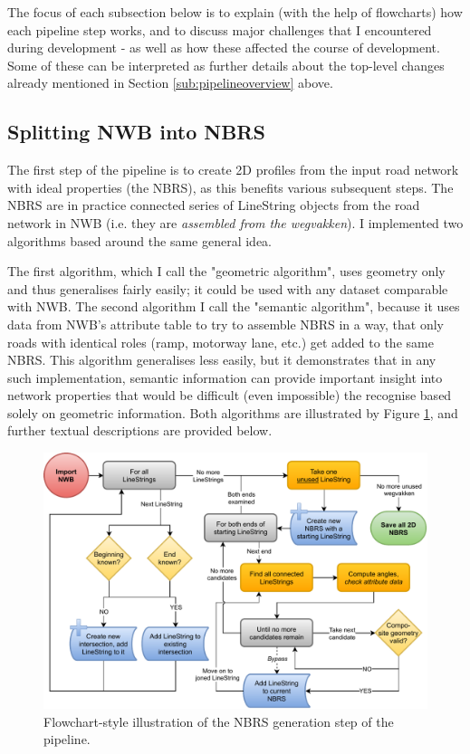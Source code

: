 The focus of each subsection below is to explain (with the help of flowcharts) how each pipeline step works, and to discuss major challenges that I encountered during development - as well as how these affected the course of development. Some of these can be interpreted as further details about the top-level changes already mentioned in Section \ref{sub:pipelineoverview} above.

\subsection{Splitting NWB into NBRS}
\label{sub:m_nbrsgeneration}

The first step of the pipeline is to create 2D profiles from the input road network with ideal properties (the NBRS), as this benefits various subsequent steps. The NBRS are in practice connected series of LineString objects from the road network in NWB (i.e. they are \textit{assembled from the wegvakken}). I implemented two algorithms based around the same general idea.

The first algorithm, which I call the "geometric algorithm", uses geometry only and thus generalises fairly easily; it could be used with any dataset comparable with NWB. The second algorithm I call the "semantic algorithm", because it uses data from NWB's attribute table to try to assemble NBRS in a way, that only roads with identical roles (ramp, motorway lane, etc.) get added to the same NBRS. This algorithm generalises less easily, but it demonstrates that in any such implementation, semantic information can provide important insight into network properties that would be difficult (even impossible) the recognise based solely on geometric information. Both algorithms are illustrated by Figure \ref{fig:nbrsgenerationflow}, and further textual descriptions are provided below.

\begin{figure}
    \centering
    \includegraphics[width=0.9\linewidth]{final_report/figs/nbrs_generation.pdf}
    \caption{Flowchart-style illustration of the NBRS generation step of the pipeline.}
    \label{fig:nbrsgenerationflow}
\end{figure}

